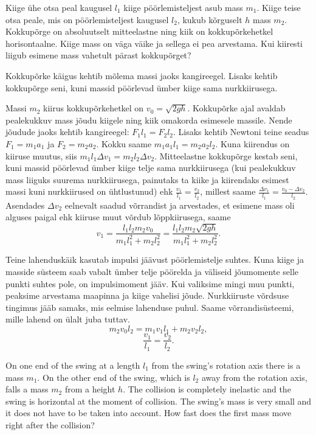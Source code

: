 
Kiige ühe otsa peal kaugusel $l_1$ kiige pöörlemisteljest asub mass $m_1$. Kiige teise otsa peale, mis on pöörlemisteljest kaugusel $l_2$, kukub kõrguselt $h$ mass $m_2$. Kokkupõrge on absoluutselt mitteelastne ning kiik on kokkupõrkehetkel horisontaalne. Kiige mass on väga väike ja sellega ei pea arvestama. Kui kiiresti liigub esimene mass vahetult pärast kokkupõrget?

\hint
Kokkupõrke käigus kehtib mõlema massi jaoks kangireegel. Lisaks kehtib kokkupõrge seni, kuni massid pöörlevad ümber kiige sama nurkkiirusega.

\solu
Massi $m_2$ kiirus kokkupõrkehetkel on $v_0=\sqrt{2gh}$. Kokkupõrke ajal avaldab pealekukkuv mass jõudu kiigele ning kiik omakorda esimesele massile. Nende jõudude jaoks kehtib kangireegel: $F_1l_1=F_2l_2$. Lisaks kehtib Newtoni teine seadus $F_1=m_1a_1$ ja $F_2=m_2a_2$. Kokku saame $m_1a_1l_1=m_2a_2l_2$. Kuna kiirendus on kiiruse muutus, siis $m_1l_1\Delta v_1=m_2l_2\Delta v_2$. Mitteelastne kokkupõrge kestab seni, kuni massid pöörlevad ümber kiige telje sama nurkkiirusega (kui pealekukkuv mass liiguks suurema nurkkiirusega, painutaks ta kiike ja kiirendaks esimest massi kuni nurkkiirused on ühtlustunud) ehk $\frac{v_1}{l_1}=\frac{v_2}{l_2}$, millest saame $\frac{\Delta v_1}{l_1}=\frac{v_0-\Delta v_2}{l_2}$. Asendades $\Delta v_2$ eelnevalt saadud võrrandist ja arvestades, et esimene mass oli alguses paigal ehk kiiruse muut võrdub lõppkiirusega, saame 
\[
v_1=\frac{l_1l_2m_2v_0}{m_1l_1^2+m_2l_2^2}=\frac{l_1l_2m_2\sqrt{2gh}}{m_1l_1^2+m_2l_2^2}.
\]

Teine lahenduskäik kasutab impulsi jäävust pöörlemistelje suhtes. Kuna kiige ja masside süsteem saab vabalt ümber telje pöörelda ja väliseid jõumomente selle punkti suhtes pole, on impulsimoment jääv. Kui valiksime mingi muu punkti, peaksime arvestama maapinna ja kiige vahelisi jõude. Nurkkiiruste võrdsuse tingimus jääb samaks, mis eelmise lahenduse puhul. Saame võrrandisüsteemi, mille lahend on ülalt juba tuttav.
\[
 m_2v_0l_2=m_1v_1l_1+m_2v_2l_2,
\]
\[
\frac{v_1}{l_1}=\frac{v_2}{l_2}.
\]

On one end of the swing at a length $l_1$ from the swing’s rotation axis there is a mass $m_1$. On the other end of the swing, which is $l_2$ away from the rotation axis, falls a mass $m_2$ from a height $h$. The collision is completely inelastic and the swing is horizontal at the moment of collision. The swing’s mass is very small and it does not have to be taken into account. How fast does the first mass move right after the collision?

